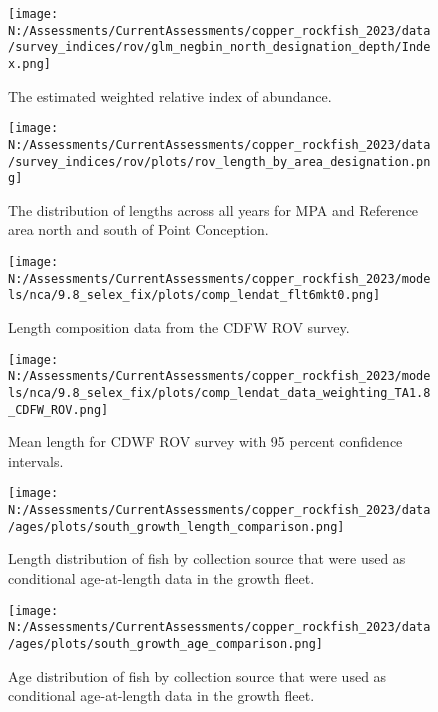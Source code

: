 \documentclass[11pt,
  english,
  letterpaper,
]{article}
\begin{document}
\pagebreak

\begin{figure}
\centering
\texttt{[image: N:/Assessments/CurrentAssessments/copper\_rockfish\_2023/data/survey\_indices/rov/glm\_negbin\_north\_designation\_depth/Index.png]}
\caption{The estimated weighted relative index of abundance.\label{fig:rov-index-main}}
\end{figure}

\pagebreak

\begin{figure}
\centering
\texttt{[image: N:/Assessments/CurrentAssessments/copper\_rockfish\_2023/data/survey\_indices/rov/plots/rov\_length\_by\_area\_designation.png]}
\caption{The distribution of lengths across all years for MPA and Reference area north and south of Point Conception.\label{fig:rov-len}}
\end{figure}

\pagebreak

\begin{figure}
\centering
\texttt{[image: N:/Assessments/CurrentAssessments/copper\_rockfish\_2023/models/nca/9.8\_selex\_fix/plots/comp\_lendat\_flt6mkt0.png]}
\caption{Length composition data from the CDFW ROV survey.\label{fig:rov-len-data}}
\end{figure}

\pagebreak

\begin{figure}
\centering
\texttt{[image: N:/Assessments/CurrentAssessments/copper\_rockfish\_2023/models/nca/9.8\_selex\_fix/plots/comp\_lendat\_data\_weighting\_TA1.8\_CDFW\_ROV.png]}
\caption{Mean length for CDWF ROV survey with 95 percent confidence intervals.\label{fig:mean-rov-len-data}}
\end{figure}

\pagebreak

\begin{figure}
\centering
\texttt{[image: N:/Assessments/CurrentAssessments/copper\_rockfish\_2023/data/ages/plots/south\_growth\_length\_comparison.png]}
\caption{Length distribution of fish by collection source that were used as conditional age-at-length data in the growth fleet.\label{fig:growth-len-dist}}
\end{figure}

\pagebreak

\begin{figure}
\centering
\texttt{[image: N:/Assessments/CurrentAssessments/copper\_rockfish\_2023/data/ages/plots/south\_growth\_age\_comparison.png]}
\caption{Age distribution of fish by collection source that were used as conditional age-at-length data in the growth fleet.\label{fig:growth-age-dist}}
\end{figure}
\end{document}

